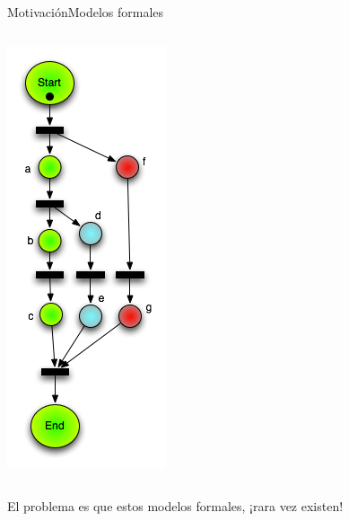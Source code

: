 \documentclass[spanish,pdf]{beamer}
\begin{document}
\begin{frame}{Motivación}{Modelos formales}
\begin{columns}
\begin{minipage}[c][0.3\textheight][c]{\linewidth}
      \end{minipage}
  \pause 
      \begin{minipage}[c][0.05\textheight][c]{\linewidth}
        \centering
        \includegraphics[width=0.5\linewidth]{img/ejemplo3.png}
      \end{minipage}
  \end{columns}
  \vspace*{-0.5cm}
  \pause 
  \begin{minipage}[c][0.4\textheight][c]{\linewidth}
    El problema es que estos modelos formales, ¡rara vez existen!
  \end{minipage}
\end{frame}
\end{document}
